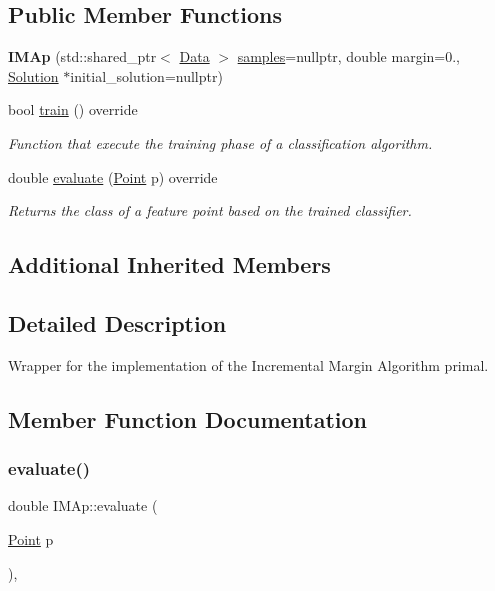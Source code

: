 \subsection*{Public Member Functions}
\begin{DoxyCompactItemize}
\item 
\mbox{\label{class_i_m_ap_a48d04d34885763d198c7adfe65dc40d7}} 
{\bfseries I\+M\+Ap} (std\+::shared\+\_\+ptr$<$ \hyperlink{class_data}{Data} $>$ \hyperlink{class_classifier_aad6a4fcea8f44339d7a6302f530852ca}{samples}=nullptr, double margin=0., \hyperlink{class_solution}{Solution} $\ast$initial\+\_\+solution=nullptr)
\item 
bool \hyperlink{class_i_m_ap_a0d9fc6d772e27882ce77902c44a91ddb}{train} () override
\begin{DoxyCompactList}\small\item\em Function that execute the training phase of a classification algorithm. \end{DoxyCompactList}\item 
double \hyperlink{class_i_m_ap_aa0c3b6c105f92e45f38bff680fdb593c}{evaluate} (\hyperlink{class_point}{Point} p) override
\begin{DoxyCompactList}\small\item\em Returns the class of a feature point based on the trained classifier. \end{DoxyCompactList}\end{DoxyCompactItemize}
\subsection*{Additional Inherited Members}


\subsection{Detailed Description}
Wrapper for the implementation of the Incremental Margin Algorithm primal. 

\subsection{Member Function Documentation}
\mbox{\label{class_i_m_ap_aa0c3b6c105f92e45f38bff680fdb593c}} 
\subsubsection{\texorpdfstring{evaluate()}{evaluate()}}
{\footnotesize\ttfamily double I\+M\+Ap\+::evaluate (\begin{DoxyParamCaption}\item[{\hyperlink{class_point}{Point}}]{p }\end{DoxyParamCaption})\hspace{0.3cm}{\ttfamily [override]}, {\ttfamily [virtual]}}



